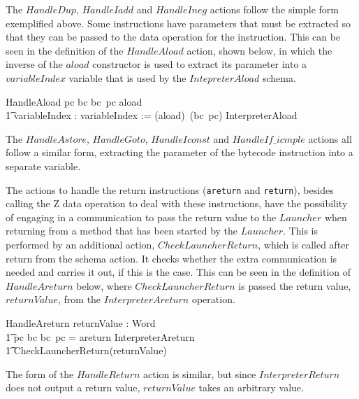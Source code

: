 The $HandleDup$, $HandleIadd$ and $HandleIneg$ actions follow the
simple form exemplified above.
Some instructions have parameters that must be extracted so that they
can be passed to the data operation for the instruction.
This can be seen in the definition of the $HandleAload$ action, shown
below, in which the inverse of the $aload$ constructor is used to
extract its parameter into a $variableIndex$ variable that is used by
the $IntepreterAload$ schema.
\begin{circusaction}
  HandleAload \circdef  \lcircguard pc \in\dom bc \land bc~pc \in \ran aload \rcircguard \circguard \\
  \t1 \circvar variableIndex : \nat \circspot variableIndex := (aload\inv)~(bc~pc) \circseq \lschexpract InterpreterAload \rschexpract
\end{circusaction}
The $HandleAstore$, $HandleGoto$, $HandleIconst$ and
$HandleIf\_icmple$ actions all follow a similar form, extracting the
parameter of the bytecode instruction into a separate variable.

The actions to handle the return instructions (\texttt{areturn} and
\texttt{return}), besides calling the Z data operation to deal with
these instructions, have the possibility of engaging in a
communication to pass the return value to the $Launcher$ when
returning from a method that has been started by the $Launcher$.
This is performed by an additional action, $CheckLauncherReturn$,
which is called after return from the schema action.
It checks whether the extra communication is needed and carries it
out, if this is the case.
This can be seen in the definition of $HandleAreturn$ below, where
$CheckLauncherReturn$ is passed the return value, $returnValue$, from
the $InterpreterAreturn$ operation.
\begin{circusaction}
  HandleAreturn \circdef \circvar returnValue : Word \circspot \\
  \t1 \lcircguard pc \in \dom bc \land bc~pc = areturn \rcircguard \circguard \lschexpract InterpreterAreturn \rschexpract \circseq \\
  \t1 CheckLauncherReturn(returnValue)
\end{circusaction}
The form of the $HandleReturn$ action is similar, but since
$InterpreterReturn$ does not output a return value, $returnValue$
takes an arbitrary value.

